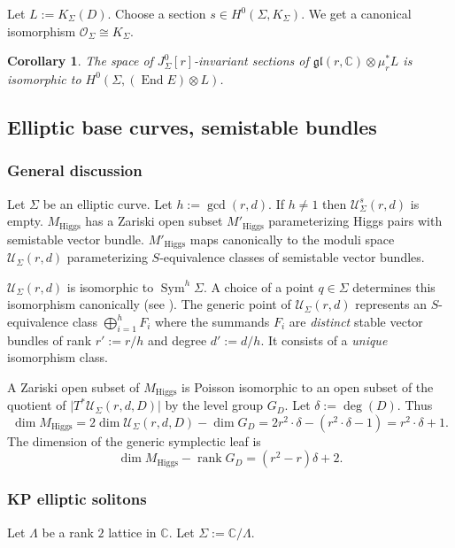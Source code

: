 \documentclass[12pt,a4paper,oneside,english]{smfart}
\newtheorem{cor}[thm]{Corollary}
\theoremstyle{definition}
\theoremstyle{remark}
\DeclareMathOperator{\End}{End}
\DeclareMathOperator{\rank}{rank}
\DeclareMathOperator{\Sym}{Sym}
\newcommand{\Hig}{\mathrm{Higgs}}
\newcommand{\MH}{M_{\Hig}}
\newcommand{\MHp}{M'_{\Hig}}
\newcommand{\cU}{\mathcal{U}}
\newcommand{\cO}{\mathcal{O}}
\newcommand{\tot}[1]{\lvert #1 \rvert}
\begin{document}
Let $L := K_\Sigma(D)$. Choose a section $s \in H^0(\Sigma, K_\Sigma)$. We get a canonical isomorphism $\cO_\Sigma \cong K_\Sigma$.

\begin{cor}\label{t9.5}
The space of $J_\Sigma^0[r]$-invariant sections of $\mathfrak{gl}(r, \mathbb{C}) \otimes \mu_r^* L$ is isomorphic to $H^0(\Sigma, (\End E) \otimes L)$.
\end{cor}

\subsection{Elliptic base curves, semistable bundles}\label{sec:9.3}

\subsubsection{General discussion}\label{sec:9.3.1}

Let $\Sigma$ be an elliptic curve. Let $h := \gcd(r, d)$. If $h \neq 1$ then $\cU_\Sigma^s(r, d)$ is empty. $\MH$ has a Zariski open subset $\MHp$ parameterizing Higgs pairs with semistable vector bundle. $\MHp$ maps canonically to the moduli space $\cU_\Sigma(r, d)$ parameterizing $S$-equivalence classes of semistable vector bundles.

$\cU_\Sigma(r, d)$ is isomorphic to $\Sym^h \Sigma$. A choice of a point $q \in \Sigma$ determines this isomorphism canonically (see \cite{Tu}). The generic point of $\cU_\Sigma(r, d)$ represents an $S$-equivalence class $\bigoplus_{i=1}^{h} F_i$ where the summands $F_i$ are \emph{distinct} stable vector bundles of rank $r' := r/h$ and degree $d' := d/h$. It consists of a \emph{unique} isomorphism class.

A Zariski open subset of $\MH$ is Poisson isomorphic to an open subset of the quotient of $\tot{T^*\cU_\Sigma(r, d, D)}$ by the level group $G_D$. Let $\delta := \deg(D)$. Thus
\[
\dim \MH = 2 \dim \cU_\Sigma(r, d, D) - \dim G_D = 2r^2 \cdot \delta - (r^2 \cdot \delta - 1) = r^2 \cdot \delta + 1.
\]
The dimension of the generic symplectic leaf is
\[
\dim \MH - \rank G_D = (r^2 - r)\delta + 2.
\]

\subsubsection{KP elliptic solitons}\label{sec:9.3.2}

Let $\Lambda$ be a rank $2$ lattice in $\mathbb{C}$. Let $\Sigma := \mathbb{C}/\Lambda$.
\end{document}
